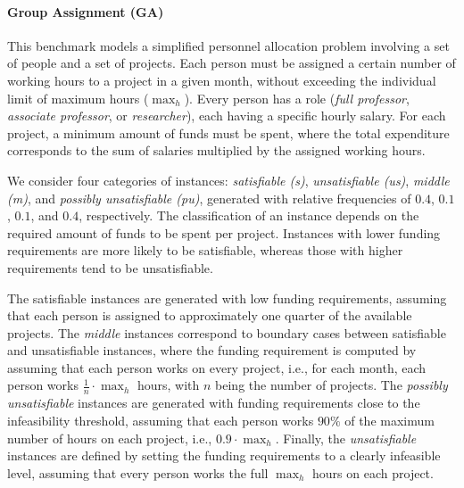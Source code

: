 \documentclass[preprint,authoryear]{elsarticle}
\theoremstyle{definition}
\begin{document}
\paragraph{Group Assignment (GA)}
This benchmark models a simplified personnel allocation problem involving a set of people and a set of projects.  
Each person must be assigned a certain number of working hours to a project in a given month, without exceeding the individual limit of maximum hours ($\max_h$).  
Every person has a role (\textit{full professor}, \textit{associate professor}, or \textit{researcher}), each having a specific hourly salary.  
For each project, a minimum amount of funds must be spent, where the total expenditure corresponds to the sum of salaries multiplied by the assigned working hours.

We consider four categories of instances: \textit{satisfiable (s)}, \textit{unsatisfiable (us)}, \textit{middle (m)}, and \textit{possibly unsatisfiable (pu)}, generated with relative frequencies of $0.4$, $0.1$, $0.1$, and $0.4$, respectively.  
The classification of an instance depends on the required amount of funds to be spent per project.  
Instances with lower funding requirements are more likely to be satisfiable, whereas those with higher requirements tend to be unsatisfiable.

The satisfiable instances are generated with low funding requirements, assuming that each person is assigned to approximately one quarter of the available projects.  
The \textit{middle} instances correspond to boundary cases between satisfiable and unsatisfiable instances, where the funding requirement is computed by assuming that each person works on every project, i.e., for each month, each person works $\frac{1}{n}{\cdot}\max_h$ hours, with $n$ being the number of projects.  
The \textit{possibly unsatisfiable} instances are generated with funding requirements close to the infeasibility threshold, assuming that each person works $90\%$ of the maximum number of hours on each project, i.e., $0.9 \cdot \max_h$.  
Finally, the \textit{unsatisfiable} instances are defined by setting the funding requirements to a clearly infeasible level, assuming that every person works the full $\max_h$ hours on each project.
\end{document}
